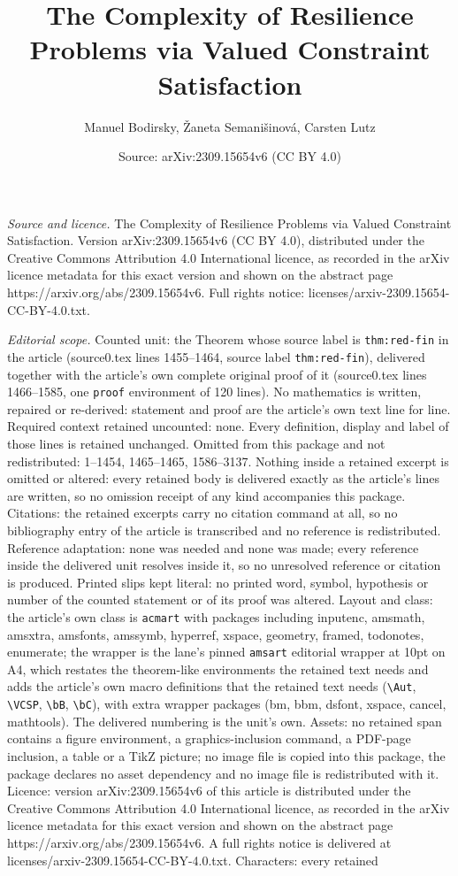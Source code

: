 \documentclass[10pt,a4paper]{amsart}
\title[The Complexity of Resilience Problems via Valued Constraint ]{The Complexity of Resilience Problems via Valued Constraint Satisfaction}
\author{Manuel Bodirsky, \v{Z}aneta Semani\v{s}inov\'a, Carsten Lutz}
\date{Source: arXiv:2309.15654v6 (CC BY 4.0)}
\begin{document}
\maketitle

\noindent\emph{Source and licence.} The Complexity of Resilience Problems via Valued Constraint Satisfaction. Version arXiv:2309.15654v6 (CC BY 4.0), distributed under the Creative Commons Attribution 4.0 International licence, as recorded in the arXiv licence metadata for this exact version and shown on the abstract page https://arxiv.org/abs/2309.15654v6. Full rights notice: licenses/arxiv-2309.15654-CC-BY-4.0.txt.\par\smallskip

\noindent\textit{Editorial scope.} Counted unit: the Theorem whose source label is \texttt{thm:red-fin} in the article (source0.tex lines 1455--1464, source label \texttt{thm:red-fin}), delivered together with the article's own complete original proof of it (source0.tex lines 1466--1585, one \texttt{proof} environment of 120 lines). No mathematics is written, repaired or re-derived: statement and proof are the article's own text line for line. Required context retained uncounted: none. Every definition, display and label of those lines is retained unchanged. Omitted from this package and not redistributed: 1--1454, 1465--1465, 1586--3137. Nothing inside a retained excerpt is omitted or altered: every retained body is delivered exactly as the article's lines are written, so no omission receipt of any kind accompanies this package. Citations: the retained excerpts carry no citation command at all, so no bibliography entry of the article is transcribed and no reference is redistributed. Reference adaptation: none was needed and none was made; every reference inside the delivered unit resolves inside it, so no unresolved reference or citation is produced. Printed slips kept literal: no printed word, symbol, hypothesis or number of the counted statement or of its proof was altered. Layout and class: the article's own class is \texttt{acmart} with packages including inputenc, amsmath, amsxtra, amsfonts, amssymb, hyperref, xspace, geometry, framed, todonotes, enumerate; the wrapper is the lane's pinned \texttt{amsart} editorial wrapper at 10pt on A4, which restates the theorem-like environments the retained text needs and adds the article's own macro definitions that the retained text needs (\texttt{\textbackslash Aut}, \texttt{\textbackslash VCSP}, \texttt{\textbackslash bB}, \texttt{\textbackslash bC}), with extra wrapper packages (bm, bbm, dsfont, xspace, cancel, mathtools). The delivered numbering is the unit's own. Assets: no retained span contains a figure environment, a graphics-inclusion command, a PDF-page inclusion, a table or a TikZ picture; no image file is copied into this package, the package declares no asset dependency and no image file is redistributed with it. Licence: version arXiv:2309.15654v6 of this article is distributed under the Creative Commons Attribution 4.0 International licence, as recorded in the arXiv licence metadata for this exact version and shown on the abstract page https://arxiv.org/abs/2309.15654v6. A full rights notice is delivered at licenses/arxiv-2309.15654-CC-BY-4.0.txt. Characters: every retained 
\end{document}
